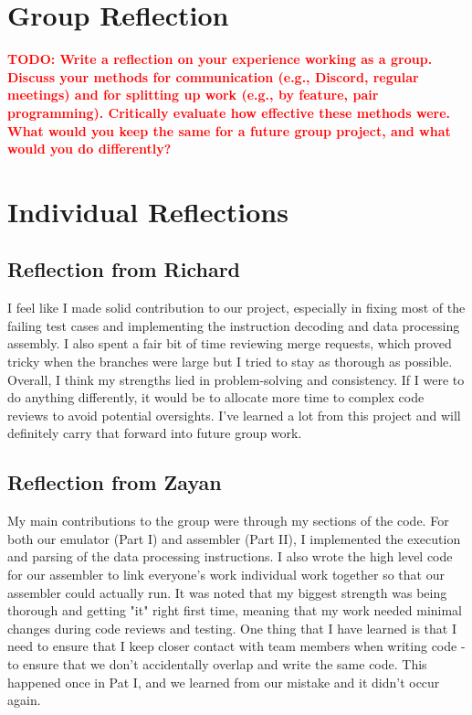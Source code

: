 \documentclass[11pt]{article}
\newcommand{\todo}[1]{\textcolor{red}{\textbf{TODO: #1}}}
\begin{document}
\section{Group Reflection}
\todo{Write a reflection on your experience working as a group. Discuss your methods for communication (e.g., Discord, regular meetings) and for splitting up work (e.g., by feature, pair programming). Critically evaluate how effective these methods were. What would you keep the same for a future group project, and what would you do differently?}


\section{Individual Reflections}
\subsection{Reflection from Richard}
I feel like I made solid contribution to our project, especially in fixing most of the failing test cases and implementing the 
instruction decoding and data processing assembly. I also spent a fair bit of time reviewing merge requests, which proved tricky 
when the branches were large but I tried to stay as thorough as possible. Overall, I think my strengths lied in problem-solving and 
consistency. If I were to do anything differently, it would be to allocate more time to complex code 
reviews to avoid potential oversights. I've learned a lot from this project and will definitely carry that forward into future group work.

\subsection{Reflection from Zayan}
My main contributions to the group were through my sections of the code. For both our emulator (Part I) and assembler (Part II), I implemented the 
execution and parsing of the data processing instructions. I also wrote the high level code for our assembler to link everyone's work individual work 
together so that our assembler could actually run. It was noted that my biggest strength was being thorough and getting "it" right first time, meaning that 
my work needed minimal changes during code reviews and testing. One thing that I have learned is that I need to ensure that I keep closer contact with 
team members when writing code - to ensure that we don't accidentally overlap and write the same code. This happened once in Pat I, and we learned from our 
mistake and it didn't occur again.
\end{document}
